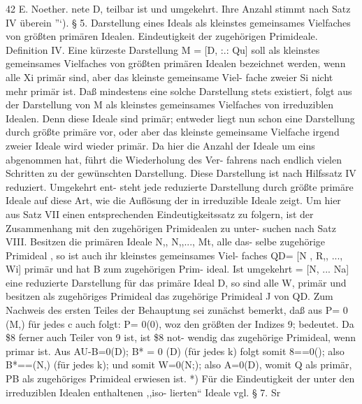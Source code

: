 \documentclass[11pt,a4paper]{article}
\theoremstyle{plain}
\theoremstyle{definition}
\begin{document}
42 
E. Noether. 
nete D, teilbar ist und umgekehrt. 
Ihre Anzahl stimmt nach Satz IV 
überein ''`). 
\S{} 5. 
Darstellung eines Ideals als kleinstes gemeinsames Vielfaches von größten 
primären Idealen. 
Eindeutigkeit der zugehörigen Primideale. 
Definition IV. Eine kürzeste Darstellung M = [D, :.: Qu] soll als 
kleinstes gemeinsames Vielfaches von größten primären Idealen bezeichnet 
werden, wenn 
alle Xi primär sind, aber das kleinste gemeinsame Viel- 
fache zweier Si nicht mehr primär ist. 
Daß mindestens eine solche Darstellung stets existiert, folgt aus der 
Darstellung von M als kleinstes gemeinsames Vielfaches von irreduziblen 
Idealen. 
Denn diese Ideale sind primär; entweder liegt nun schon eine 
Darstellung durch größte primäre vor, oder aber das kleinste gemeinsame 
Vielfache irgend zweier Ideale wird wieder primär. 
Da hier die Anzahl 
der Ideale um eins abgenommen hat, führt 
die Wiederholung des Ver- 
fahrens nach endlich vielen Schritten zu der gewünschten Darstellung. 
Diese Darstellung ist nach Hilfssatz IV reduziert. 
Umgekehrt ent- 
steht jede reduzierte Darstellung durch größte primäre Ideale 
auf diese 
Art, wie die Auflösung der  in irreduzible Ideale zeigt. 
Um hier aus 
Satz VII 
einen entsprechenden Eindeutigkeitssatz 
zu 
folgern, ist der Zusammenhang mit den zugehörigen Primidealen zu unter- 
suchen nach 
Satz VIII. 
Besitzen die primären Ideale N,, N,,..., Mt, alle das- 
selbe zugehörige Primideal , so ist auch ihr kleinstes gemeinsames Viel- 
faches 
QD= [N , R,, ..., Wi] primär und hat B zum zugehörigen Prim- 
ideal. 
Ist umgekehrt 
= [N, ... Na] eine reduzierte Darstellung für das 
primäre Ideal D, so sind alle W, primär und besitzen als zugehöriges 
Primideal das zugehörige Primideal J von QD. 
Zum Nachweis des ersten Teiles der Behauptung sei zunächst bemerkt, 
daß aus P= 0 (M,) für jedes c auch folgt: P= 0(0), woz den größten 
der Indizes 9; bedeutet. 
Da \$8 ferner auch Teiler von 9 ist, ist \$8 not- 
wendig das zugehörige Primideal, wenn 
primar ist. 
Aus 
AU-B=0(D); 
B* = 0 (D) (für jedes k) 
folgt somit 
 8==0(); 
also B*==(N,) 
(für jedes k); 
und somit 
W=0(N;); also 
A=0(D), 
womit Q als primär, PB als zugehöriges Primideal erwiesen ist. 
*) Für die Eindeutigkeit der unter den irreduziblen Idealen enthaltenen ,,iso- 
lierten`` Ideale vgl. \S{} 7. 
Sr
\end{document}
